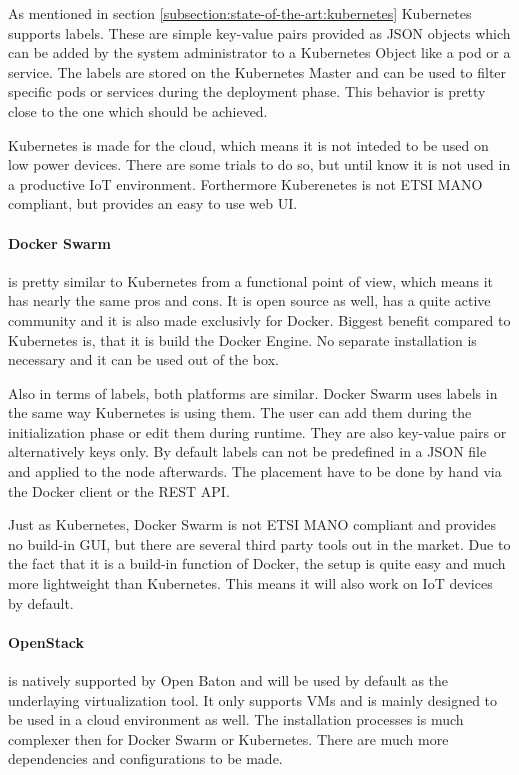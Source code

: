 As mentioned in section \ref{subsection:state-of-the-art:kubernetes} Kubernetes supports labels.
These are simple key-value pairs provided as \ac{JSON} objects which can be added by the system administrator to a Kubernetes Object like a pod or a service.
The labels are stored on the Kubernetes Master and can be used to filter specific pods or services during the deployment phase.
This behavior is pretty close to the one which should be achieved.

Kubernetes is made for the cloud, which means it is not inteded to be used on low power devices.
There are some trials to do so, but until know it is not used in a productive \ac{IoT} environment.
Forthermore Kuberenetes is not \ac{ETSI} \ac{MANO} compliant, but provides an easy to use web \ac{UI}.

\paragraph{Docker Swarm} is pretty similar to Kubernetes from a functional point of view, which means it has nearly the same pros and cons.
It is open source as well, has a quite active community and it is also made exclusivly for Docker.
Biggest benefit compared to Kubernetes is, that it is build the Docker Engine.
No separate installation is necessary and it can be used out of the box.

Also in terms of labels, both platforms are similar.
Docker Swarm uses labels in the same way Kubernetes is using them.
The user can add them during the initialization phase or edit them during runtime.
They are also key-value pairs or alternatively keys only.
By default labels can not be predefined in a \ac{JSON} file and applied to the node afterwards.
The placement have to be done by hand via the Docker client or the \ac{REST} \ac{API}.

Just as Kubernetes, Docker Swarm is not \ac{ETSI} \ac{MANO} compliant and provides no build-in \ac{GUI}, but there are several third party tools out in the market.
Due to the fact that it is a build-in function of Docker, the setup is quite easy and much more lightweight than Kubernetes.
This means it will also work on \ac{IoT} devices by default.

\paragraph{OpenStack} is natively supported by Open Baton and will be used by default as the underlaying virtualization tool.
It only supports \acp{VM} and is mainly designed to be used in a cloud environment as well.
The installation processes is much complexer then for Docker Swarm or Kubernetes.
There are much more dependencies and configurations to be made.

